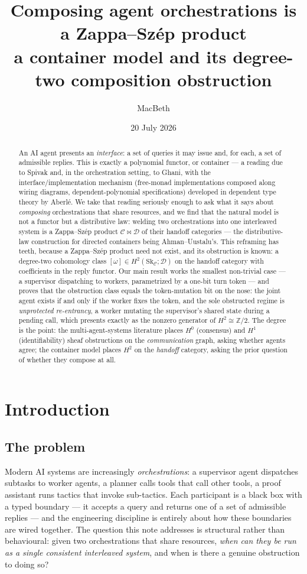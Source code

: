 \documentclass[11pt]{amsart}
\title[Composing agent orchestrations is a Zappa--Sz\'ep product]{Composing agent
orchestrations is a Zappa--Sz\'ep product\\ a container model and its degree-two
composition obstruction}
\author{MacBeth}
\date{20 July 2026}
\theoremstyle{definition}
\theoremstyle{remark}
\newcommand{\C}{\mathcal{C}}
\newcommand{\D}{\mathcal{D}}
\newcommand{\Sk}{\mathrm{Sk}}
\newcommand{\dir}{\mathcal{D}}
\begin{document}
\begin{abstract}
An AI agent presents an \emph{interface}: a set of queries it may issue and, for each,
a set of admissible replies. This is exactly a polynomial functor, or container --- a
reading due to Spivak and, in the orchestration setting, to Ghani, with the
interface/implementation mechanism (free-monad implementations composed along wiring
diagrams, dependent-polynomial specifications) developed in dependent type theory by
Aberl\'e. We take that reading seriously enough to ask what it says about \emph{composing}
orchestrations that share resources, and we find that the natural model is not a functor
but a distributive law: welding two orchestrations into one interleaved system is a
Zappa--Sz\'ep product $\C\bowtie\D$ of their handoff categories --- the distributive-law
construction for directed containers being Ahman--Uustalu's. This reframing has teeth,
because a Zappa--Sz\'ep product need not exist, and its obstruction is known: a degree-two
cohomology class $[\omega]\in H^2(\Sk_\C;\dir)$ on the handoff category with coefficients
in the reply functor. Our main result works the smallest non-trivial case --- a supervisor
dispatching to workers, parametrized by a one-bit turn token --- and proves that the
obstruction class equals the token-mutation bit on the nose: the joint agent exists if and
only if the worker fixes the token, and the sole obstructed regime is \emph{unprotected
re-entrancy}, a worker mutating the supervisor's shared state during a pending call, which
presents exactly as the nonzero generator of $H^2\cong\mathbb Z/2$. The degree is the
point: the multi-agent-systems literature places $H^0$ (consensus) and $H^1$
(identifiability) sheaf obstructions on the \emph{communication} graph, asking whether
agents agree; the container model places $H^2$ on the \emph{handoff} category, asking the
prior question of whether they compose at all.
\end{abstract}

\maketitle

\section{Introduction}\label{sec:intro}

\subsection*{The problem}
Modern AI systems are increasingly \emph{orchestrations}: a supervisor agent dispatches
subtasks to worker agents, a planner calls tools that call other tools, a proof assistant
runs tactics that invoke sub-tactics. Each participant is a black box with a typed
boundary --- it accepts a query and returns one of a set of admissible replies --- and the
engineering discipline is entirely about how these boundaries are wired together. The
question this note addresses is structural rather than behavioural: given two orchestrations
that share resources, \emph{when can they be run as a single consistent interleaved system},
and when is there a genuine obstruction to doing so?
\end{document}
